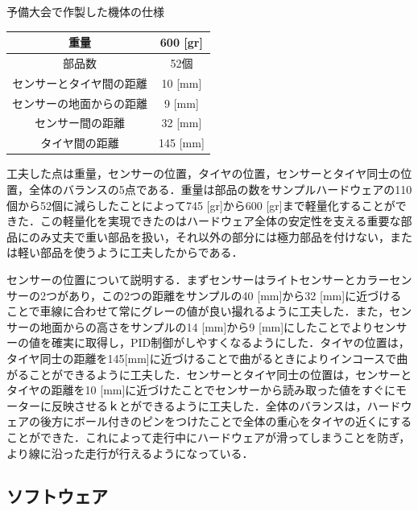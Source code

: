 \begin{multicols*}{2}
\begin{center}
\begin{tablehere}
	\caption{予備大会で作製した機体の仕様}
	\label{tab:spec1}
	\begin{tabular}{c|c}
	\doubleRule
	重量 & 600 [gr] \\\hline
	部品数 & 52個 \\\hline
	センサーとタイヤ間の距離 & 10 [mm]\\\hline
	センサーの地面からの距離 & 9 [mm]\\\hline
	センサー間の距離 & 32 [mm]\\\hline
	タイヤ間の距離 & 145 [mm]\\\hline
	\bottomrule
	\end{tabular}
\end{tablehere}
\end{center}

工夫した点は重量，センサーの位置，タイヤの位置，センサーとタイヤ同士の位置，全体のバランスの5点である．重量は部品の数をサンプルハードウェアの110個から52個に減らしたことによって745 [gr]から600 [gr]まで軽量化することができた．この軽量化を実現できたのはハードウェア全体の安定性を支える重要な部品にのみ丈夫で重い部品を扱い，それ以外の部分には極力部品を付けない，または軽い部品を使うように工夫したからである．

センサーの位置について説明する．まずセンサーはライトセンサーとカラーセンサーの2つがあり，この2つの距離をサンプルの40 [mm]から32 [mm]に近づけることで車線に合わせて常にグレーの値が良い撮れるように工夫した．また，センサーの地面からの高さをサンプルの14 [mm]から9 [mm]にしたことでよりセンサーの値を確実に取得し，PID制御がしやすくなるようにした．タイヤの位置は，タイヤ同士の距離を145[mm]に近づけることで曲がるときによりインコースで曲がることができるように工夫した．センサーとタイヤ同士の位置は，センサーとタイヤの距離を10 [mm]に近づけたことでセンサーから読み取った値をすぐにモーターに反映させるｋとができるように工夫した．全体のバランスは，ハードウェアの後方にボール付きのピンをつけたことで全体の重心をタイヤの近くにすることができた．これによって走行中にハードウェアが滑ってしまうことを防ぎ，より線に沿った走行が行えるようになっている．

\subsection{ソフトウェア}%

\end{multicols*}

